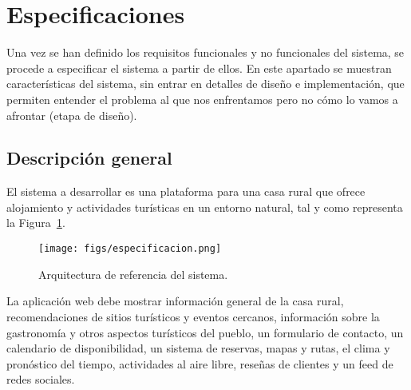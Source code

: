 \section{Especificaciones}\label{sec:especificaciones-sistema}
Una vez se han definido los requisitos funcionales y no funcionales del sistema, se procede a especificar el sistema a partir de ellos. En este apartado se muestran características del sistema, sin entrar en detalles de diseño e implementación, que permiten entender el problema al que nos enfrentamos pero no cómo lo vamos a afrontar (etapa de diseño).

\subsection{Descripción general}
El sistema a desarrollar es una plataforma para una casa rural que ofrece alojamiento y actividades turísticas en un entorno natural, tal y como representa la  Figura~\ref{fig:especificacion}.
\begin{figure}[h!t]
    \centering
    \texttt{[image: figs/especificacion.png]}
    \caption{Arquitectura de referencia del sistema.}
    \label{fig:especificacion}
\end{figure}
La aplicación web debe mostrar información general de la casa rural, recomendaciones de sitios turísticos y eventos cercanos, información sobre la gastronomía y otros aspectos turísticos del pueblo, un formulario de contacto, un calendario de disponibilidad, un sistema de reservas, mapas y rutas, el clima y pronóstico del tiempo, actividades al aire libre, reseñas de clientes y un feed de redes sociales.

